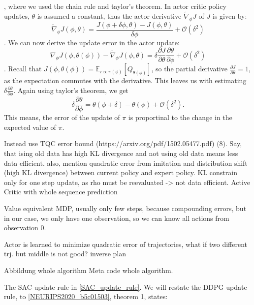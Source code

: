 , where we used the chain rule and taylor's theorem. In actor critic policy updates, $\theta$ is assumed a constant, thus the actor derivative 
$\widetilde{\nabla}_\phi J$ of $J$ is given by:
\begin{equation}
    \widetilde{\nabla}_\phi J(\phi, \theta) =  \frac{J(\phi + \delta \phi, \theta) - J(\phi, \theta)}{\delta \phi} + \mathcal{O}(\delta^2)
\end{equation}
. We can now derive the update error in the actor update:
\begin{equation}
    \nabla_{\phi} J(\phi, \theta(\phi)) - \widetilde{\nabla}_\phi J(\phi, \theta) = \delta \frac{\partial J}{\partial \theta} \frac{\partial \theta}{\partial \phi} + \mathcal{O}(\delta^2)
\end{equation}
. Recall that $J(\phi, \theta(\phi)) = \mathbb{E}_{\tau \propto \pi(\phi)}\left[Q_{\theta(\phi)}\right]$, so the partial derivative $\frac{\partial J}{\partial \theta} = 1$, 
as the expectation commutes with the derivative. This leaves us with estimating $\delta \frac{\partial \theta}{\partial \phi}$. Again using taylor's theorem, we get 
\begin{equation}
    \delta \frac{\partial \theta}{\partial \phi} = \theta(\phi + \delta) - \theta(\phi) + \mathcal{O}(\delta^2).
\end{equation}
This means, the error of the update of $\pi$ is proportinal to the change in the expected value of $\pi$. 

Instead use TQC error bound (https://arxiv.org/pdf/1502.05477.pdf) (8). 
Say, that ising old data has high KL divergence and not using old data means less data efficient. also, mention quadratic error from imitation and 
distribution shift (high KL divergence) between current policy and expert policy.
KL constrain only for one step update, as rho must be reevaluated -> not data efficient. 
Active Critic with whole sequence prediction

Value equivalent MDP, usually only few steps, because compounding errors, but in our case, we only have one observation, so we can know all actions from observation 0. 

Actor is learned to minimize quadratic error of trajectories, what if two different trj. but middle is not good? inverse plan

Abbildung whole algorithm
Meta code whole algorithm.


The SAC update rule in \ref{SAC_update_rule}. We will restate the DDPG update rule, to 
\ref{NEURIPS2020_b5c01503}, theorem 1, states:

